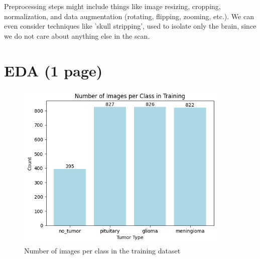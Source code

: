 \documentclass[conference]{IEEEtran}
\begin{document}
Preprocessing steps might include things like image resizing, cropping, normalization, and data augmentation (rotating, flipping, zooming, etc.). We can even consider techniques like 'skull stripping', used to isolate only the brain, since we do not care about anything else in the scan.


\section{EDA (1 page)}



\begin{figure}[!ht]
    \centering
    \includegraphics[width=4in]{images/ImagesPerClassTraining.png}
    \caption{Number of images per class in the training dataset}
    \label{Number of images per class in the training dataset}
\end{figure}
\end{document}
